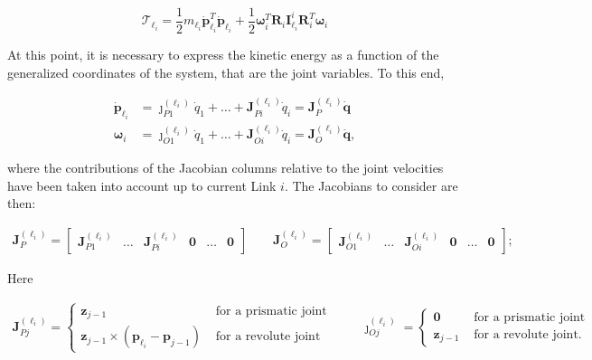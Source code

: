 \documentclass[10pt]{article}
\begin{document}
$$
\mathcal{T}_{\ell_{i}}=\frac{1}{2} m_{\ell_{i}} \dot{\boldsymbol{p}}_{\ell_{i}}^{T} \dot{\boldsymbol{p}}_{\ell_{i}}+\frac{1}{2} \boldsymbol{\omega}_{i}^{T} \boldsymbol{R}_{i} \boldsymbol{I}_{\ell_{i}}^{i} \boldsymbol{R}_{i}^{T} \boldsymbol{\omega}_{i}
$$

At this point, it is necessary to express the kinetic energy as a function of the generalized coordinates of the system, that are the joint variables. To this end, 

$$
\begin{aligned}
\dot{\boldsymbol{p}}_{\ell_{i}} & =\boldsymbol{\jmath}_{P 1}^{\left(\ell_{i}\right)} \dot{q}_{1}+\ldots+\boldsymbol{J}_{P i}^{\left(\ell_{i}\right)} \dot{q}_{i}=\boldsymbol{J}_{P}^{\left(\ell_{i}\right)} \dot{\boldsymbol{q}} \\
\boldsymbol{\omega}_{i} & =\boldsymbol{\jmath}_{O 1}^{\left(\ell_{i}\right)} \dot{q}_{1}+\ldots+\boldsymbol{J}_{O i}^{\left(\ell_{i}\right)} \dot{q}_{i}=\boldsymbol{J}_{O}^{\left(\ell_{i}\right)} \dot{\boldsymbol{q}},
\end{aligned}
$$

where the contributions of the Jacobian columns relative to the joint velocities have been taken into account up to current Link $i$. The Jacobians to consider are then:

$$
\begin{aligned}
\boldsymbol{J}_{P}^{\left(\ell_{i}\right)}  =\left[\begin{array}{llllll}
\boldsymbol{J}_{P 1}^{\left(\ell_{i}\right)} & \ldots & \boldsymbol{J}_{P i}^{\left(\ell_{i}\right)} & \mathbf{0} & \ldots & \mathbf{0}
\end{array}\right]  \qquad
\boldsymbol{J}_{O}^{\left(\ell_{i}\right)}  =\left[\begin{array}{llllll}
\boldsymbol{J}_{O 1}^{\left(\ell_{i}\right)} & \ldots & \boldsymbol{J}_{O i}^{\left(\ell_{i}\right)} & \mathbf{0} & \ldots & \mathbf{0}
\end{array}\right] ;
\end{aligned}
$$ 

Here



$$
\begin{gathered}
\boldsymbol{J}_{P j}^{\left(\ell_{i}\right)}= \begin{cases}\boldsymbol{z}_{j-1} & \text { for a prismatic joint } \\
\boldsymbol{z}_{j-1} \times\left(\boldsymbol{p}_{\ell_{i}}-\boldsymbol{p}_{j-1}\right) &
\text { for a revolute joint }\end{cases} \qquad
\boldsymbol{\jmath}_{O j}^{\left(\ell_{i}\right)}= \begin{cases}\mathbf{0} & \text { for a prismatic joint } \\
\boldsymbol{z}_{j-1} & \text { for a revolute joint. }\end{cases}
\end{gathered}
$$
\end{document}
